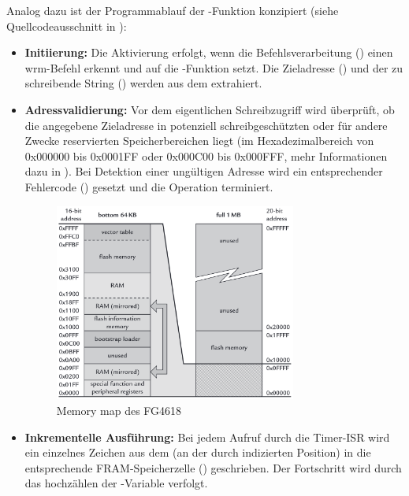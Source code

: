 \newpage
Analog dazu ist der Programmablauf der -Funktion konzipiert (siehe Quellcodeausschnitt in ):
\begin{itemize}
	\item \textbf{Initiierung:} Die Aktivierung erfolgt, wenn die Befehlsverarbeitung () einen \grqq wrm\grqq-Befehl erkennt und  auf die -Funktion setzt. Die Zieladresse () und der zu schreibende String () werden aus dem  extrahiert.
	
	\item \textbf{Adressvalidierung:} Vor dem eigentlichen Schreibzugriff wird \"uberpr\"uft, ob die angegebene Zieladresse in potenziell schreibgesch\"utzten oder f\"ur andere Zwecke reservierten Speicherbereichen liegt (\zB im Hexadezimalbereich von 0x000000 bis 0x0001FF oder 0x000C00 bis 0x000FFF, mehr Informationen dazu in ). Bei Detektion einer ung\"ultigen Adresse wird ein entsprechender Fehlercode () gesetzt und die Operation terminiert.
	
	\begin{figure}[h!]
		\centering
		\includegraphics[width=0.75\textwidth]{../Bilder/memory_map.png}
		\caption{Memory map des FG4618 }
		\label{fig:memory_map}
	\end{figure}
	
	\item \textbf{Inkrementelle Ausf\"uhrung:} Bei jedem Aufruf durch die Timer-ISR wird ein einzelnes Zeichen aus dem  (an der durch  indizierten Position) in die entsprechende FRAM-Speicherzelle () geschrieben. Der Fortschritt wird durch das hochz\"ahlen der -Variable verfolgt.
	

\end{itemize}
